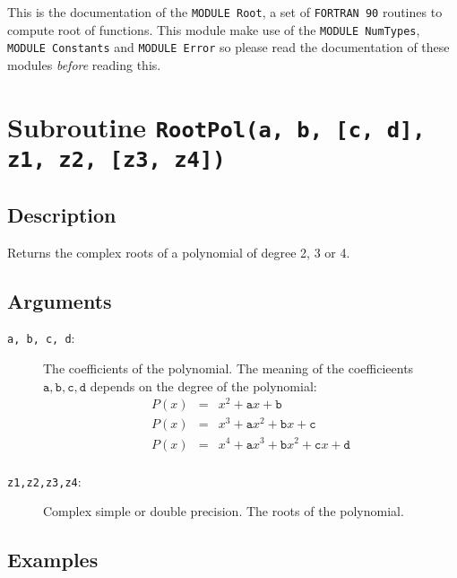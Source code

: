 This is the documentation of the \texttt{MODULE Root}, a set
of \texttt{FORTRAN 90} routines to compute root of functions. This
module make use of the \texttt{MODULE NumTypes}, \texttt{MODULE
  Constants} and \texttt{MODULE Error} so please read the
documentation of these modules \emph{before} reading this. 


\section{Subroutine \texttt{RootPol(a, b, [c, d], z1, z2, [z3, z4])}}

\subsection{Description}

Returns the complex roots of a polynomial of degree 2, 3 or 4. 

\subsection{Arguments}

\begin{description}
\item[\texttt{a, b, c, d}:] The coefficients of the polynomial. The
  meaning of the coefficieents $\mathtt{a,b,c,d}$ depends on the
  degree of the polynomial:
  \begin{eqnarray*}
    P(x) &=& x^2 + \mathtt{a}x + \mathtt{b} \\
    P(x) &=& x^3 + \mathtt{a}x^2 + \mathtt{b}x + \mathtt{c}\\
    P(x) &=& x^4 + \mathtt{a}x^3 + \mathtt{b}x^2 + \mathtt{c}x + \mathtt{d}\\
  \end{eqnarray*}
\item[\texttt{z1,z2,z3,z4}:] Complex simple or double precision. The
  roots of the polynomial.
\end{description}

\subsection{Examples}

